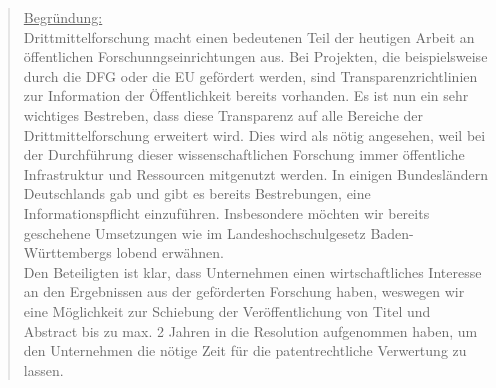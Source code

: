 \documentclass[10pt,oneside]{scrartcl}
\begin{document}
\begin{quote}
\underline{Begründung:}\\
Drittmittelforschung macht einen bedeutenen Teil der heutigen Arbeit an öffentlichen Forschunngseinrichtungen aus. Bei Projekten, die beispielsweise durch die DFG oder die EU gefördert werden, sind Transparenzrichtlinien zur Information der Öffentlichkeit bereits vorhanden. Es ist nun ein sehr wichtiges Bestreben, dass diese Transparenz auf alle Bereiche der Drittmittelforschung erweitert wird. Dies wird als nötig angesehen, weil bei der Durchführung dieser wissenschaftlichen Forschung immer öffentliche Infrastruktur und Ressourcen mitgenutzt werden. In einigen Bundesländern Deutschlands gab und gibt es bereits Bestrebungen, eine Informationspflicht einzuführen. Insbesondere möchten wir bereits geschehene Umsetzungen wie im Landeshochschulgesetz Baden-Württembergs lobend erwähnen.\\
Den Beteiligten ist klar, dass Unternehmen einen wirtschaftliches Interesse an den Ergebnissen aus der geförderten Forschung haben, weswegen wir eine Möglichkeit zur Schiebung der Veröffentlichung von Titel und Abstract bis zu max. 2 Jahren in die Resolution aufgenommen haben, um den Unternehmen die nötige Zeit für die patentrechtliche Verwertung zu lassen.

\end{quote}
\end{document}
